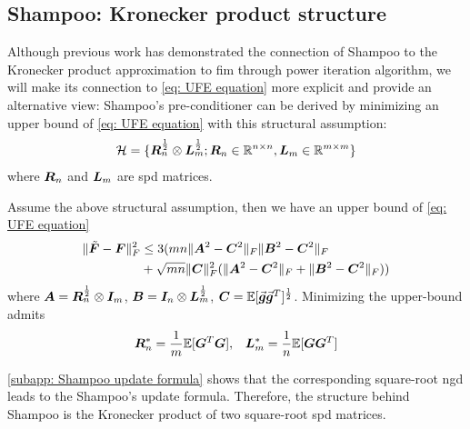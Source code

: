 \subsection{Shampoo: Kronecker product structure}
\label{subsec: shampoo}
Although previous work \citep{morwani2024new} has demonstrated the connection of Shampoo \citep{gupta2018shampoo} to the Kronecker product approximation to \gls{fim} through power iteration algorithm, 
we will make its connection to \cref{eq: UFE equation} more explicit and provide an alternative view: Shampoo's pre-conditioner can be derived by minimizing an upper bound of \cref{eq: UFE equation} with this structural assumption: 
\begin{align*}
    \mathcal{H}=\{{\bm{R}}_n^{\frac{1}{2}} \otimes {\bm{L}}_m^{\frac{1}{2}}; {\bm{R}}_n\in\mathbb{R}^{n\times n}, {\bm{L}}_m\in\mathbb{R}^{m\times m}\}
\end{align*}
where ${\bm{R}}_n$ and ${\bm{L}}_m$ are \gls{spd} matrices.
\begin{theorem}
    Assume the above structural assumption, then we have an upper bound of \cref{eq: UFE equation}
    \begin{align}
        \Vert\tilde{\bm{F}}-{\bm{F}}\Vert_F^2 &\leq 3(mn\Vert{\bm{A}}^2-{\bm{C}}^2\Vert_F\Vert{\bm{B}}^2-{\bm{C}}^2\Vert_F\nonumber\\
        &+ \sqrt{mn}\Vert{\bm{C}}\Vert_F^2(\Vert{\bm{A}}^2-{\bm{C}}^2\Vert_F+\Vert{\bm{B}}^2-{\bm{C}}^2\Vert_F))
        \label{eq: shampoo upper bound}
    \end{align}
    where ${\bm{A}} = {\bm{R}}_n^{\frac{1}{2}}\otimes {\bm{I}}_m$, ${\bm{B}} = {\bm{I}}_n \otimes {\bm{L}}_m^{\frac{1}{2}}$, ${\bm{C}}=\mathbb{E}[\vec{\bm{g}}\vec{\bm{g}}^T]^{\frac{1}{2}}$. Minimizing the upper-bound admits
    \begin{align*}
        {\bm{R}}_n^* = \frac{1}{m}\mathbb{E}[{\bm{G}}^T{\bm{G}}],\;\;\; {\bm{L}}_m^* = \frac{1}{n}\mathbb{E}[{\bm{G}}{\bm{G}}^T]
    \end{align*}
    \label{thm: optimal shampoo}
\end{theorem}
\cref{subapp: Shampoo update formula} shows that the corresponding square-root \gls{ngd} leads to the Shampoo's update formula. Therefore, the structure behind Shampoo is the Kronecker product of two square-root \gls{spd} matrices.


